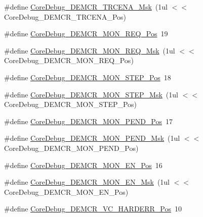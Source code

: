 \begin{DoxyCompactItemize}
\#define \hyperlink{group___c_m_s_i_s___c_m3___core_debug_ga5e99652c1df93b441257389f49407834}{Core\-Debug\-\_\-\-D\-E\-M\-C\-R\-\_\-\-T\-R\-C\-E\-N\-A\-\_\-\-Msk}~(1ul $<$$<$ Core\-Debug\-\_\-\-D\-E\-M\-C\-R\-\_\-\-T\-R\-C\-E\-N\-A\-\_\-\-Pos)
\item 
\#define \hyperlink{group___c_m_s_i_s___c_m3___core_debug_ga341020a3b7450416d72544eaf8e57a64}{Core\-Debug\-\_\-\-D\-E\-M\-C\-R\-\_\-\-M\-O\-N\-\_\-\-R\-E\-Q\-\_\-\-Pos}~19
\item 
\#define \hyperlink{group___c_m_s_i_s___c_m3___core_debug_gae6384cbe8045051186d13ef9cdeace95}{Core\-Debug\-\_\-\-D\-E\-M\-C\-R\-\_\-\-M\-O\-N\-\_\-\-R\-E\-Q\-\_\-\-Msk}~(1ul $<$$<$ Core\-Debug\-\_\-\-D\-E\-M\-C\-R\-\_\-\-M\-O\-N\-\_\-\-R\-E\-Q\-\_\-\-Pos)
\item 
\#define \hyperlink{group___c_m_s_i_s___c_m3___core_debug_ga9ae10710684e14a1a534e785ef390e1b}{Core\-Debug\-\_\-\-D\-E\-M\-C\-R\-\_\-\-M\-O\-N\-\_\-\-S\-T\-E\-P\-\_\-\-Pos}~18
\item 
\#define \hyperlink{group___c_m_s_i_s___c_m3___core_debug_ga2ded814556de96fc369de7ae9a7ceb98}{Core\-Debug\-\_\-\-D\-E\-M\-C\-R\-\_\-\-M\-O\-N\-\_\-\-S\-T\-E\-P\-\_\-\-Msk}~(1ul $<$$<$ Core\-Debug\-\_\-\-D\-E\-M\-C\-R\-\_\-\-M\-O\-N\-\_\-\-S\-T\-E\-P\-\_\-\-Pos)
\item 
\#define \hyperlink{group___c_m_s_i_s___c_m3___core_debug_ga1e2f706a59e0d8131279af1c7e152f8d}{Core\-Debug\-\_\-\-D\-E\-M\-C\-R\-\_\-\-M\-O\-N\-\_\-\-P\-E\-N\-D\-\_\-\-Pos}~17
\item 
\#define \hyperlink{group___c_m_s_i_s___c_m3___core_debug_ga68ec55930269fab78e733dcfa32392f8}{Core\-Debug\-\_\-\-D\-E\-M\-C\-R\-\_\-\-M\-O\-N\-\_\-\-P\-E\-N\-D\-\_\-\-Msk}~(1ul $<$$<$ Core\-Debug\-\_\-\-D\-E\-M\-C\-R\-\_\-\-M\-O\-N\-\_\-\-P\-E\-N\-D\-\_\-\-Pos)
\item 
\#define \hyperlink{group___c_m_s_i_s___c_m3___core_debug_ga802829678f6871863ae9ecf60a10425c}{Core\-Debug\-\_\-\-D\-E\-M\-C\-R\-\_\-\-M\-O\-N\-\_\-\-E\-N\-\_\-\-Pos}~16
\item 
\#define \hyperlink{group___c_m_s_i_s___c_m3___core_debug_gac2b46b9b65bf8d23027f255fc9641977}{Core\-Debug\-\_\-\-D\-E\-M\-C\-R\-\_\-\-M\-O\-N\-\_\-\-E\-N\-\_\-\-Msk}~(1ul $<$$<$ Core\-Debug\-\_\-\-D\-E\-M\-C\-R\-\_\-\-M\-O\-N\-\_\-\-E\-N\-\_\-\-Pos)
\item 
\#define \hyperlink{group___c_m_s_i_s___c_m3___core_debug_gaed9f42053031a9a30cd8054623304c0a}{Core\-Debug\-\_\-\-D\-E\-M\-C\-R\-\_\-\-V\-C\-\_\-\-H\-A\-R\-D\-E\-R\-R\-\_\-\-Pos}~10
\item 
$$
\end{DoxyCompactItemize}
